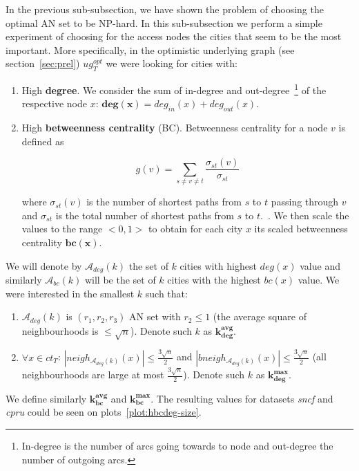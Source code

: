 		In the previous sub-subsection, we have shown the problem of choosing the optimal AN set to be NP-hard. In this sub-subsection we perform a simple experiment of choosing for the access nodes the cities that seem to be the most important. More specifically, in the optimistic underlying graph (see section~\ref{sec:prel}) $ug_{T}^{opt}$ we were looking for cities with:
		\begin{enumerate}
			\item High \textbf{degree}. We consider the sum of in-degree and out-degree~\footnote{In-degree is the number of arcs going towards to node and out-degree the number of outgoing arcs.} of the respective node $x$: $\bm{deg(x)} = deg_{in}(x) + deg_{out}(x)$.
			\item High \textbf{betweenness centrality} (BC). Betweenness centrality for a node $v$ is defined as 
			
			$$g(v) = \sum_{s \neq v \neq t} \frac{\displaystyle \sigma_{st}(v)}{\displaystyle \sigma_{st}}$$
			
			where $\sigma_{st}(v)$ is the number of shortest paths from $s$ to $t$ passing through $v$ and $\sigma_{st}$ is the total number of shortest paths from $s$ to $t$.~\cite{centrality01}. We then scale the values to the range $<0, 1>$ to obtain for each city $x$ its scaled betweenness centrality $\bm{bc(x)}$.
		\end{enumerate}
		\hspace*{\fill}
		
		\noindent We will denote by $\mathcal{A}_{deg}(k)$ the set of $k$ cities with highest $deg(x)$ value and similarly $\mathcal{A}_{bc}(k)$ will be the set of $k$ cities with the highest $bc(x)$ value. We were interested in the smallest $k$ such that:
		\begin{enumerate}
			\item $\mathcal{A}_{deg}(k)$ is $(r_{1}, r_{2}, r_{3})$ AN set with $r_{2} \leq 1$ (the average square of neighbourhoods is $\leq \sqrt{n}$). Denote such $k$ as $\bm{k_{deg}^{avg}}$.
			\item $\forall x \in ct_{T}$: $|neigh_{\mathcal{A}_{deg}(k)}(x)| \leq \frac{3\sqrt{n}}{2}$ and $|bneigh_{\mathcal{A}_{deg}(k)}(x)| \leq \frac{3\sqrt{n}}{2}$ (all neighbourhoods are large at most $\frac{3\sqrt{n}}{2}$). Denote such $k$ as $\bm{k_{deg}^{max}}$.
		\end{enumerate}		 
		\hspace*{\fill}
		
		\noindent We define similarly $\bm{k_{bc}^{avg}}$ and $\bm{k_{bc}^{max}}$. The resulting values for datasets \textit{sncf} and \textit{cpru} could be seen on plots~\ref{plot:hbcdeg-size}.
		
